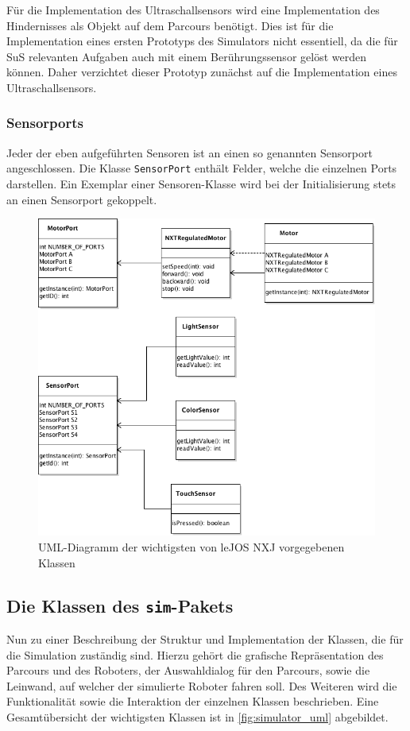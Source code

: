 \documentclass[paper=a4, DIV=calc, BCOR=12mm, twoside=on, onecolumn=on, open = right, titlepage =on, parskip =half-, headsepline = on, footsepline = off, chapterprefix = off, appendixprefix = on, fontsize = 12pt, numbers = noenddot, abstract = on]{scrbook}
\begin{document}
Für die Implementation des Ultraschallsensors wird eine Implementation des Hindernisses als Objekt auf dem Parcours benötigt. Dies ist für die Implementation eines ersten Prototyps des Simulators nicht essentiell, da die für SuS relevanten Aufgaben auch mit einem Berührungssensor gelöst werden können. Daher verzichtet dieser Prototyp zunächst auf die Implementation eines Ultraschallsensors.

\subsubsection{Sensorports}
Jeder der eben aufgeführten Sensoren ist an einen so genannten Sensorport angeschlossen. Die Klasse \texttt{SensorPort} enthält Felder, welche die einzelnen Ports darstellen. Ein Exemplar einer Sensoren-Klasse wird bei der Initialisierung stets an einen Sensorport gekoppelt. 
\clearpage


\begin{figure}[H]
\centering
\hspace{-3.5cm}\includegraphics[scale=0.68]{images/uml_api_essenz.png}
\caption[UML-Diagramm der Klassen im \texttt{nxt}-Paket]{UML-Diagramm der wichtigsten von leJOS NXJ vorgegebenen Klassen}
\label{fig:api_uml}
\end{figure}


\par \singlespacing
\subsection{Die Klassen des \texttt{sim}-Pakets}
\label{sec:simpaket}
\onehalfspacing
Nun zu einer Beschreibung der Struktur und Implementation der Klassen, die für die Simulation zuständig sind. Hierzu gehört die grafische Repräsentation des Parcours und des Roboters, der Auswahldialog für den Parcours, sowie die Leinwand, auf welcher der simulierte Roboter fahren soll. Des Weiteren wird die Funktionalität sowie die Interaktion der einzelnen Klassen beschrieben. Eine Gesamtübersicht der wichtigsten Klassen ist in \ref{fig:simulator_uml} abgebildet.
\end{document}
